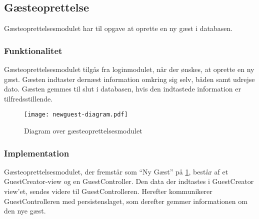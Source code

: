 \subsection{Gæsteoprettelse}
\label{sub:GuestCreator}

Gæsteoprettelsesmodulet har til opgave at oprette en ny gæst i databasen.

\subsubsection{Funktionalitet}
\label{ssub:GuestCreator_funktionalitet}

Gæsteoprettelsesmodulet tilgås fra loginmodulet, når der ønskes, at oprette en ny gæst. Gæsten indtaster dernæst information omkring sig selv, båden samt udrejse dato. Gæsten gemmes til slut i databasen, hvis den indtastede information er tilfredsstillende.

\begin{figure}
  \centering
  \texttt{[image: newguest-diagram.pdf]}
  \caption{Diagram over gæsteoprettelsesmodulet}
  \label{fig:guestcreator}
\end{figure}

\subsubsection{Implementation}
\label{ssub:GuestCreator_implementation}

Gæsteoprettelsesmodulet, der fremstår som \enquote{Ny Gæst} på \cref{fig:guestcreator}, består af et GuestCreator-view og en GuestController. Den data der indtastes i GuestCreator view'et, sendes videre til GuestControlleren. Herefter kommunikerer GuestControlleren med persistenslaget, som derefter gemmer informationen om den nye gæst.
